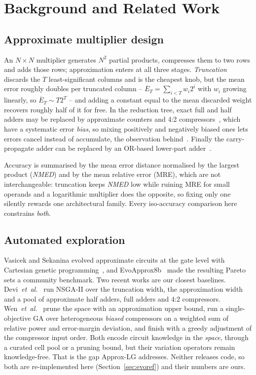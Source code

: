 \documentclass[acmsmall,review,anonymous]{acmart}
\newcommand{\nmed}{\textit{NMED}}
\begin{document}
\section{Background and Related Work}
\subsection{Approximate multiplier design}
\label{sec:amdesign}
An $N\times N$ multiplier generates $N^2$ partial products, compresses them to
two rows and adds those rows; approximation enters at all three stages.
\emph{Truncation} discards the $T$ least-significant columns and is the
cheapest knob, but the mean error roughly doubles per truncated column --
$\overline{E}_{T}=\sum_{i<T}w_i2^{i}$ with $w_i$ growing linearly, so
$\overline{E}_{T}\sim T2^{T}$ -- and adding a constant equal
to the mean discarded weight recovers roughly half of it for free.  In the
reduction tree, exact full and half adders may be replaced by approximate
counters and 4:2
compressors~\cite{momeni2015,akbari2017,venkatachalam2017,strollo2020}, which
have a systematic error \emph{bias}, so mixing positively and negatively biased
ones lets errors cancel instead of accumulate, the observation
behind~\cite{wen2025}.  Finally the carry-propagate adder can be replaced by an
OR-based lower-part adder~\cite{mahdiani2010}.

Accuracy is summarised by the mean error distance normalised by the largest
product (\nmed{}) and by the mean relative error (MRE), which are not
interchangeable: truncation keeps \nmed{} low while ruining MRE for small
operands and a logarithmic multiplier does the opposite, so fixing only one
silently rewards one architectural family.  Every iso-accuracy comparison here
constrains \emph{both}.

\subsection{Automated exploration}
Vasicek and Sekanina evolved approximate circuits at the gate level with
Cartesian genetic programming~\cite{vasicek2015}, and
EvoApprox8b~\cite{mrazek2017} made the resulting Pareto sets a community
benchmark.  Two recent works are our closest baselines.
Devi~\emph{et~al.}~\cite{devi2025} run NSGA-II over the truncation width, the
approximation width and a pool of approximate half adders, full adders and 4:2
compressors.  Wen~\emph{et~al.}~\cite{wen2025} prune the space with an
approximation upper bound, run a single-objective GA over heterogeneous
\emph{biased} compressors on a weighted sum of relative power and error-margin
deviation, and finish with a greedy adjustment of the compressor input order.
Both encode circuit knowledge in the \emph{space}, through a curated cell pool
or a pruning bound, but their variation operators remain knowledge-free.  That
is the gap Approx-LG addresses.  Neither releases code, so both are
re-implemented here (Section~\ref{sec:evoref}) and their numbers are ours.
\end{document}
